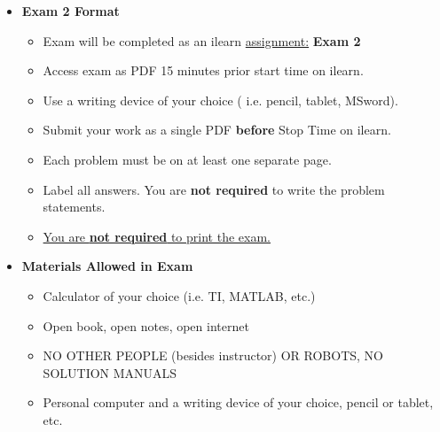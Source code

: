\documentclass[11pt]{article}
\newcommand{\EXAMNUM}{2}
\begin{document}
\begin{itemize}
             	\item  \textbf{\Large Exam \EXAMNUM\hspace{2mm} Format}
\begin{itemize}
		
			\item Exam will be completed as an ilearn \underline{assignment:} {\bf Exam  \EXAMNUM} 
			
			\item Access exam as PDF 15 minutes prior start time on ilearn.
			\item Use a writing device of your choice ( i.e. pencil, tablet, MSword).
			\item Submit your work as a single PDF {\bf before} Stop Time on ilearn.		 		\item Each problem must be on at least one separate page.
			\item Label all answers. You are {\bf not required} to write the problem statements.
			\item \underline{You are {\bf not required} to print the exam.}
\end{itemize}


		

		\item  \textbf{ Materials Allowed in Exam}

	\begin{itemize}

		\item  Calculator of your choice (i.e. TI, MATLAB, etc.)
	
		\item  Open book, open notes, open internet
		
		\item  NO OTHER PEOPLE (besides instructor) OR ROBOTS, NO SOLUTION MANUALS\vspace{1mm}
		
		\item  Personal computer and a writing device of your choice, pencil or tablet, etc.
			

\end{itemize}
\end{itemize}
\end{document}
